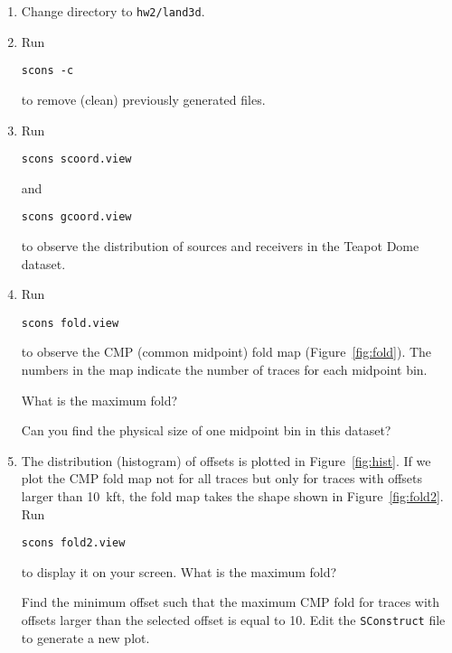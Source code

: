 \begin{enumerate}          
\item Change directory to \texttt{hw2/land3d}.
\item Run
\begin{verbatim}
scons -c
\end{verbatim}
to remove (clean) previously generated files.
\item Run
\begin{verbatim}
scons scoord.view 
\end{verbatim}
and
\begin{verbatim}
scons gcoord.view 
\end{verbatim}
to observe the distribution of sources and receivers in the Teapot Dome dataset.

\item Run
\begin{verbatim}
scons fold.view 
\end{verbatim}
to observe the CMP (common midpoint) fold map (Figure~\ref{fig:fold}). The numbers in the map
indicate the number of traces for each midpoint bin.

What is the maximum fold? 

\answer{%

}

Can you find the physical size of one midpoint bin in this dataset?

\answer{%

}

\item The distribution (histogram) of offsets is plotted in Figure~\ref{fig:hist}. If we plot the CMP fold map not for all traces but only for traces with offsets larger than 10~kft, the fold map takes the shape shown in Figure~\ref{fig:fold2}. Run
\begin{verbatim}
scons fold2.view 
\end{verbatim}
to display it on your screen. What is the maximum fold?

Find the minimum offset such that the maximum CMP fold for traces with offsets larger than the selected offset is equal to 10. Edit the \texttt{SConstruct} file to generate a new plot.




\end{enumerate}
